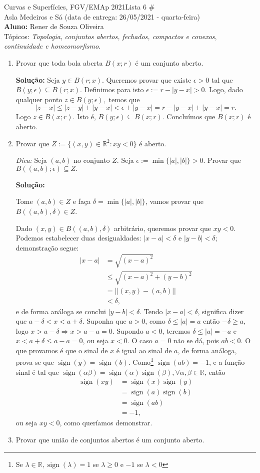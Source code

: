 \documentclass[12pt]{article}
\newcommand{\R}{\mathbb{R}}
\newcommand{\op}[1]{\operatorname{#1}}
\begin{document}
Curvas e Superfícies, FGV/EMAp  2021\hfill Lista 6 \#\\
Asla Medeiros e Sá (data de entrega: 26/05/2021 - quarta-feira)\\
\textbf{Aluno:} Rener de Souza Oliveira\\
Tópicos: {\it Topologia}, {\it conjuntos abertos, fechados, compactos e conexos}, {\it continuidade e homeomorfismo}.

\hrulefill

\begin{enumerate}

\item Provar que toda bola aberta $B(x;r)$ \'e um conjunto aberto.\cite{analise2}

\textbf{Solu\c{c}\~ao:} 
Seja $y\in B(r;x).$ Queremos provar que existe $\epsilon>0$ tal que $B(y;\epsilon)\subseteq B(r;x).$ Definimos para isto $\epsilon:= r-|y-x|>0.$ Logo, dado qualquer ponto $z\in B(y;\epsilon),$ temos que
$$
|z-x| \leq |z-y|+|y-x| < \epsilon+|y-x| =  r-|y-x| +|y-x| =r.
$$
Logo $z\in B(x;r).$ Isto \'e, $B(y;\epsilon) \subseteq B(x;r).$ Conclu\'imos que $B(x;r)$ \'e aberto.

\item Provar que $Z:=\{(x,y)\in \R^2: xy<0\}$ é aberto. 

\emph{Dica:} Seja $(a,b)$ no conjunto $Z$. Seja $\epsilon:=\min\{|a|,|b| \}>0.$ Provar que $B((a,b);\epsilon)\subseteq Z.$

\textbf{Solução:}

Tome $(a,b)\in Z$ e faça $\delta =\min\{|a|,|b|\}$, vamos provar que $B((a,b),\delta)\in Z$.

Dado $(x,y)\in B((a,b),\delta)$ arbitrário, queremos provar que $xy<0$. Podemos estabelecer duas desigualdades: $|x-a|<\delta$ e $|y-b|<\delta$; demonstração segue:
\begin{align*}
	|x-a|&=\sqrt{(x-a)^2}\\
	&\leq\sqrt{(x-a)^2+(y-b)^2}\\
	&=||(x,y)-(a,b)||\\
	&<\delta,
\end{align*}
e de forma análoga se conclui $|y-b|<\delta$. Tendo $|x-a|<\delta$, significa dizer que $a-\delta<x<a+\delta$. Suponha que $a>0$, como $\delta\leq |a|=a$ então $-\delta\geq a$, logo $x>a-\delta\Rightarrow x>a-a=0$. Supondo $a<0$, teremos $\delta\leq |a|=-a$ e $x<a+\delta\leq a-a=0$, ou seja $x<0$. O caso $a=0$ não se dá, pois $ab<0$. O que provamos é que o sinal de $x$ é igual ao sinal de $a$, de forma análoga, prova-se que $\op{sign}(y)=\op{sign}(b)$. Como\footnote{Se $\lambda\in\R,\op{sign}(\lambda)=1$ se $\lambda\geq0$ e $-1$ se $\lambda<0$} $\op{sign}(ab)=-1$, e a função sinal é tal que $\op{sign}(\alpha\beta)=\op{sign}(\alpha)\op{sign}(\beta),\forall\alpha,\beta\in\R$, então \begin{align*}
	\op{sign}(xy)&=\op{sign}(x)\op{sign}(y)\\
	&=\op{sign}(a)\op{sign}(b)\\
	&=\op{sign}(ab)\\
	&=-1,
\end{align*}
ou seja $xy<0$, como queríamos demonstrar.
\item Provar que união de conjuntos abertos é um conjunto aberto.


\end{enumerate}
\end{document}
